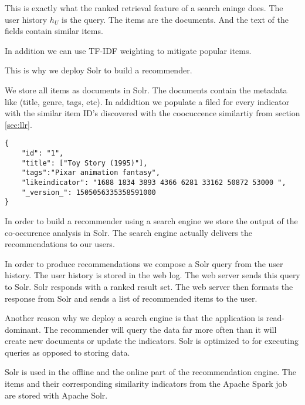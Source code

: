 This is exactly what the ranked retrieval feature of a search eninge does.
The user history $h_U$ is the query. The items are the documents. And the text of the fields contain similar items.

In addition we can use TF-IDF \cite{Manning} weighting to mitigate popular items.

This is why we deploy Solr to build a recommender.

We store all items as documents in Solr. The documents contain the metadata like (title, genre, tags, etc). In addidtion we populate a filed for every indicator with the similar item ID's discovered with the coocuccence similartiy from section \ref{sec:llr}.

\begin{lstlisting}[caption={Item metadata and similar items are stored in Solr.},label={lst:solrdoc}]
{
    "id": "1",
    "title": ["Toy Story (1995)"],
    "tags":"Pixar animation fantasy",
    "likeindicator": "1688 1834 3893 4366 6281 33162 50872 53000 ",
    "_version_": 1505056335358591000
}
\end{lstlisting}

In order to build a recommender using a search engine we store the output of the co-occurence analysis in Solr. The search engine actually delivers the recommendations to our users.

In order to produce recommendations we compose a Solr query from the user history. The user history is stored in the web log. The web server sends this query to Solr. Solr responds with a ranked result set. The web server then formats the response from Solr and sends a list of recommended items to the user.

Another reason why we deploy a search engine is that the application is read-dominant. The recommender will query the data far more often than it will create new documents or update the indicators. Solr is optimized to for executing queries as opposed to storing data.



Solr is used in the offline and the online part of the recommendation engine.
The items and their corresponding similarity indicators from the Apache Spark job are stored with Apache Solr. 


